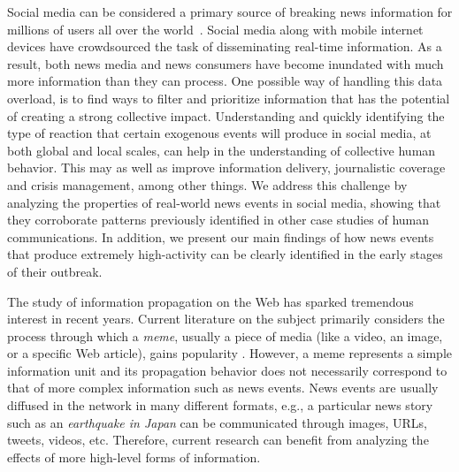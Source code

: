 Social media can be considered a primary source of breaking news information for
millions of users all over the world~\cite{Kwak:2010}.
%
Social media along with mobile internet devices have crowdsourced the
task of disseminating real-time information. 
%
As a result, both news media and news consumers have become inundated with much
more information than they can process. 
%
One possible way of handling this data overload, is to find ways to filter and
prioritize information that has the potential of creating a strong collective
impact. 
%
Understanding and quickly identifying the type of reaction that certain
exogenous events will produce in social media, at both global and
local scales, can help in the understanding of collective human behavior.
%
This may as well as improve information delivery, journalistic coverage and
crisis management, among other things. 
%
We address this challenge by analyzing the properties of real-world news events
in social media, showing that they corroborate patterns previously identified in
other case studies of human communications. 
%
In addition, we present our main findings of how news events that produce
extremely high-activity can be clearly identified in the early stages of their
outbreak.


The study of information propagation on the Web has sparked tremendous interest
in recent years. 
%
Current literature on the subject primarily considers the process through which
a {\em meme}, usually a piece of media (like a video, an image, or a specific
Web article), gains popularity
\cite{Castillo:2014,Szabo:2010,Lerman:2010,Tatar2014,Pinto:2013,Ahmed:2013,Li:2016:concept:drift,
Liu:2015:UN}. 
%
However, a meme represents a simple information unit and its propagation
behavior does not necessarily correspond to that of more complex information
such as news events. 
%
News events are usually diffused in the network in many different formats, e.g.,
a particular news story such as an {\em earthquake in Japan} can be communicated
through images, URLs, tweets, videos, etc. 
%
Therefore, current research can benefit from analyzing the effects of more
high-level forms of information. 

